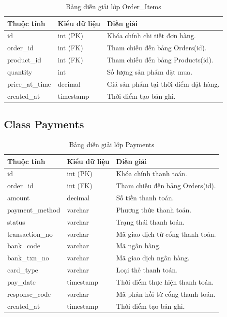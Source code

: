 \begin{table}[H]
\centering
\caption{Bảng diễn giải lớp Order\_Items}
\label{tab:order_items}
\begin{tabular}{|l|l|p{7cm}|}
\hline
\textbf{Thuộc tính} & \textbf{Kiểu dữ liệu} & \textbf{Diễn giải} \\ \hline
id & int (PK) & Khóa chính chi tiết đơn hàng. \\ \hline
order\_id & int (FK) & Tham chiếu đến bảng Orders(id). \\ \hline
product\_id & int (FK) & Tham chiếu đến bảng Products(id). \\ \hline
quantity & int & Số lượng sản phẩm đặt mua. \\ \hline
price\_at\_time & decimal & Giá sản phẩm tại thời điểm đặt hàng. \\ \hline
created\_at & timestamp & Thời điểm tạo bản ghi. \\ \hline
\end{tabular}
\end{table}

\subsection{Class Payments}

\begin{table}[H]
\centering
\caption{Bảng diễn giải lớp Payments}
\label{tab:payments}
\begin{tabular}{|l|l|p{7cm}|}
\hline
\textbf{Thuộc tính} & \textbf{Kiểu dữ liệu} & \textbf{Diễn giải} \\ \hline
id & int (PK) & Khóa chính thanh toán. \\ \hline
order\_id & int (FK) & Tham chiếu đến bảng Orders(id). \\ \hline
amount & decimal & Số tiền thanh toán. \\ \hline
payment\_method & varchar & Phương thức thanh toán. \\ \hline
status & varchar & Trạng thái thanh toán. \\ \hline
transaction\_no & varchar & Mã giao dịch từ cổng thanh toán. \\ \hline
bank\_code & varchar & Mã ngân hàng. \\ \hline
bank\_txn\_no & varchar & Mã giao dịch ngân hàng. \\ \hline
card\_type & varchar & Loại thẻ thanh toán. \\ \hline
pay\_date & timestamp & Thời điểm thực hiện thanh toán. \\ \hline
response\_code & varchar & Mã phản hồi từ cổng thanh toán. \\ \hline
created\_at & timestamp & Thời điểm tạo bản ghi. \\ \hline
\end{tabular}
\end{table}

